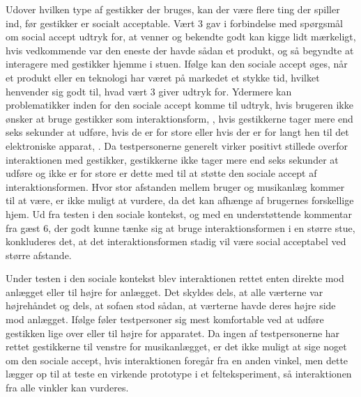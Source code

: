 Udover hvilken type af gestikker der bruges, kan der være flere ting der spiller ind, før gestikker er socialt acceptable. Vært 3 gav i forbindelse med spørgsmål om social accept udtryk for, at venner og bekendte godt kan kigge lidt mærkeligt, hvis vedkommende var den eneste der havde sådan et produkt, og så begyndte at interagere med gestikker hjemme i stuen. Ifølge \textcite[s. 276]{PDF:WouldYouDoThat} kan den sociale accept øges, når et produkt eller en teknologi har været på markedet et stykke tid, hvilket henvender sig godt til, hvad vært 3 giver udtryk for. Ydermere kan problematikker inden for den sociale accept komme til udtryk, hvis brugeren ikke ønsker at bruge gestikker som interaktionsform, \parencite[s. 276]{PDF:WouldYouDoThat}, hvis gestikkerne tager mere end seks sekunder at udføre, hvis de er for store eller hvis der er for langt hen til det elektroniske apparat, \parencite[s. 199]{PDF:AreYouComfortableDoingThat}. Da testpersonerne generelt virker positivt stillede overfor interaktionen med gestikker, gestikkerne ikke tager mere end seks sekunder at udføre og ikke er for store er dette med til at støtte den sociale accept af interaktionsformen. Hvor stor afstanden mellem bruger og musikanlæg kommer til at være, er ikke muligt at vurdere, da det kan afhænge af brugernes forskellige hjem. Ud fra testen i den sociale kontekst, og med en understøttende kommentar fra gæst 6, der godt kunne tænke sig at bruge interaktionsformen i en større stue, konkluderes det, at det interaktionsformen stadig vil være social acceptabel ved større afstande.  

Under testen i den sociale kontekst blev interaktionen rettet enten direkte mod anlægget eller til højre for anlægget. Det skyldes dels, at alle værterne var højrehåndet og dels, at sofaen stod sådan, at værterne havde deres højre side mod anlægget. Ifølge \textcite[s. 197]{PDF:AreYouComfortableDoingThat} føler testpersoner sig mest komfortable ved at udføre gestikken lige over eller til højre for apparatet. Da ingen af testpersonerne har rettet gestikkerne til venstre for musikanlægget, er det ikke muligt at sige noget om den sociale accept, hvis interaktionen foregår fra en anden vinkel, men dette lægger op til at teste en virkende prototype i et felteksperiment, så interaktionen fra alle vinkler kan vurderes. 
%